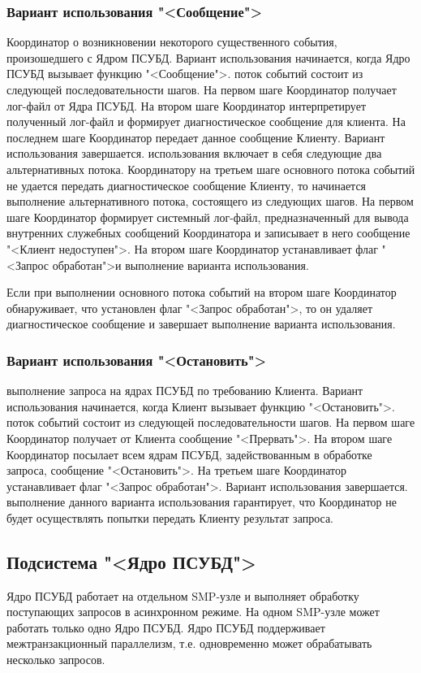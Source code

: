 \documentclass[11pt,oneside]{article}
\begin{document}
\subsubsection{Вариант использования "<Сообщение">}
 Координатор о возникновении некоторого существенного события, произошедшего с Ядром ПСУБД. Вариант использования начинается, когда Ядро ПСУБД вызывает функцию "<Сообщение">.
 поток событий состоит из следующей последовательности шагов. На первом шаге Координатор получает лог-файл от Ядра ПСУБД. На втором шаге Координатор интерпретирует полученный лог-файл и формирует диагностическое сообщение для клиента. На последнем шаге Координатор передает данное сообщение Клиенту. Вариант использования завершается.
 использования включает в себя следующие два альтернативных потока.
 Координатору на третьем шаге основного потока событий не удается передать диагностическое сообщение Клиенту, то начинается выполнение альтернативного потока, состоящего из следующих шагов. На первом шаге Координатор формирует системный лог-файл, предназначенный для вывода внутренних служебных сообщений Координатора и записывает в него сообщение "<Клиент недоступен">. На втором шаге Координатор устанавливает флаг "<Запрос обработан">и  выполнение варианта использования.
\par Если при выполнении основного потока событий на втором шаге Координатор обнаруживает, что установлен флаг "<Запрос обработан">, то он удаляет диагностическое сообщение и завершает выполнение варианта использования.

\subsubsection{Вариант использования "<Остановить">}
 выполнение запроса на ядрах ПСУБД по требованию Клиента. Вариант использования начинается, когда Клиент вызывает функцию "<Остановить">.
 поток событий состоит из следующей последовательности шагов. На первом шаге Координатор получает от Клиента сообщение "<Прервать">. На втором шаге Координатор посылает всем ядрам ПСУБД, задействованным в обработке запроса, сообщение "<Остановить">. На третьем шаге Координатор устанавливает флаг "<Запрос обработан">. Вариант использования завершается.
 выполнение данного варианта использования гарантирует, что Координатор не будет осуществлять попытки передать Клиенту результат запроса.

\subsection{Подсистема "<Ядро ПСУБД">}\label{S_Kernel}
Ядро ПСУБД работает на отдельном SMP-узле и выполняет обработку поступающих запросов в асинхронном режиме. На одном SMP-узле может работать только одно Ядро ПСУБД. Ядро ПСУБД поддерживает межтранзакционный параллелизм, т.е. одновременно может обрабатывать несколько запросов.
\end{document}
